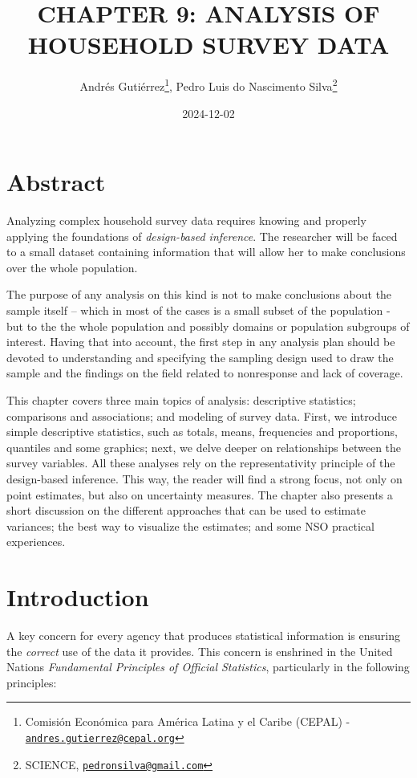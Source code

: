 \documentclass[
  12pt,
]{book}
\title{CHAPTER 9: ANALYSIS OF HOUSEHOLD SURVEY DATA}
\author{Andrés Gutiérrez\footnote{Comisión Económica para América Latina y el Caribe (CEPAL) - \href{mailto:andres.gutierrez@cepal.org}{\nolinkurl{andres.gutierrez@cepal.org}}}, Pedro Luis do Nascimento Silva\footnote{SCIENCE, \href{mailto:pedronsilva@gmail.com}{\nolinkurl{pedronsilva@gmail.com}}}}
\date{2024-12-02}
\begin{document}
\maketitle

{
\hypersetup{linkcolor=}
\setcounter{tocdepth}{0}
\tableofcontents
}
\listoffigures
\listoftables
\hypertarget{abstract}{%
\chapter*{Abstract}\label{abstract}}

Analyzing complex household survey data requires knowing and properly applying the foundations of \emph{design-based inference}. The researcher will be faced to a small dataset containing information that will allow her to make conclusions over the whole population.

The purpose of any analysis on this kind is not to make conclusions about the sample itself -- which in most of the cases is a small subset of the population - but to the the whole population and possibly domains or population subgroups of interest. Having that into account, the first step in any analysis plan should be devoted to understanding and specifying the sampling design used to draw the sample and the findings on the field related to nonresponse and lack of coverage.

This chapter covers three main topics of analysis: descriptive statistics; comparisons and associations; and modeling of survey data. First, we introduce simple descriptive statistics, such as totals, means, frequencies and proportions, quantiles and some graphics; next, we delve deeper on relationships between the survey variables. All these analyses rely on the representativity principle of the design-based inference. This way, the reader will find a strong focus, not only on point estimates, but also on uncertainty measures. The chapter also presents a short discussion on the different approaches that can be used to estimate variances; the best way to visualize the estimates; and some NSO practical experiences.

\hypertarget{introduction}{%
\chapter*{Introduction}\label{introduction}}

A key concern for every agency that produces statistical information is ensuring the \emph{correct} use of the data it provides. This concern is enshrined in the United Nations \emph{Fundamental Principles of Official Statistics}, particularly in the following principles:
\end{document}
